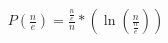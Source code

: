 \documentclass[preview]{standalone}
\begin{document}
\begin{align*}
P(\frac{n}{e})=\frac{\frac{n}{e}}{n}*(\ln(\frac{n}{\frac{n}{e}}))
\end{align*}
\end{document}
